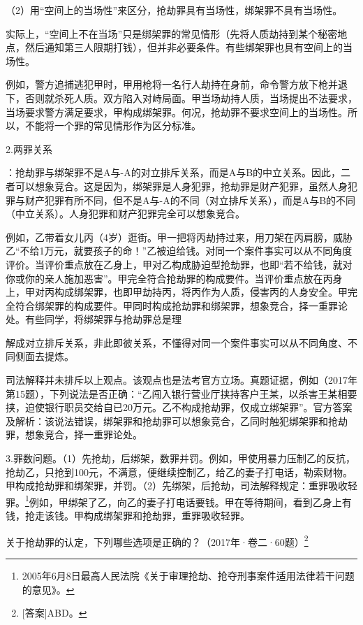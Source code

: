 （2）用“空间上的当场性”来区分，抢劫罪具有当场性，绑架罪不具有当场性。

实际上，“空间上不在当场”只是绑架罪的常见情形（先将人质劫持到某个秘密地点，然后通知第三人限期打钱），但并非必要条件。有些绑架罪也具有空间上的当场性。

例如，警方追捕逃犯甲时，甲用枪将一名行人劫持在身前，命令警方放下枪并退下，否则就杀死人质。双方陷入对峙局面。甲当场劫持人质，当场提出不法要求，当场要求警方满足要求，甲构成绑架罪。何况，抢劫罪不要求空间上的当场性。所以，不能将一个罪的常见情形作为区分标准。

2.两罪关系

：抢劫罪与绑架罪不是A与-A的对立排斥关系，而是A与B的中立关系。因此，二者可以想象竞合。这是因为，绑架罪是人身犯罪，抢劫罪是财产犯罪，虽然人身犯罪与财产犯罪有所不同，但不是A与-A的不同（对立排斥关系），而是A与B的不同（中立关系）。人身犯罪和财产犯罪完全可以想象竞合。

例如，乙带着女儿丙（4岁）逛街。甲一把将丙劫持过来，用刀架在丙肩膀，威胁乙“不给1万元，就要孩子的命！”乙被迫给钱。对同一个案件事实可以从不同角度评价。当评价重点放在乙身上，甲对乙构成胁迫型抢劫罪，也即“若不给钱，就对你或你的亲人施加恶害”。甲完全符合抢劫罪的构成要件。当评价重点放在丙身上，甲对丙构成绑架罪，也即甲劫持丙，将丙作为人质，侵害丙的人身安全。甲完全符合绑架罪的构成要件。甲同时构成抢劫罪和绑架罪，想象竞合，择一重罪论处。有些同学，将绑架罪与抢劫罪总是理

解成对立排斥关系，非此即彼关系，不懂得对同一个案件事实可以从不同角度、不同侧面去提炼。

司法解释并未排斥以上观点。该观点也是法考官方立场。真题证据，例如（2017年第15题），下列说法是否正确：“乙闯入银行营业厅挟持客户王某，以杀害王某相要挟，迫使银行职员交给自已20万元。乙不构成抢劫罪，仅成立绑架罪”。官方答案及解析：该说法错误，绑架罪和抢劫罪可以想象竞合，乙同时触犯绑架罪和抢劫罪，想象竞合，择一重罪论处。

3.罪数问题。（1）先抢劫，后绑架，数罪并罚。例如，甲使用暴力压制乙的反抗，抢劫乙，只抢到100元，不满意，便继续控制乙，给乙的妻子打电话，勒索财物。甲构成抢劫罪和绑架罪，并罚。（2）先绑架，后抢劫，司法解释规定：重罪吸收轻罪。\footnote{2005年6月8日最高人民法院《关于审理抢劫、抢夺刑事案件适用法律若干问题的意见》。}例如，甲绑架了乙，向乙的妻子打电话要钱。甲在等待期间，看到乙身上有钱，抢走该钱。甲构成绑架罪和抢劫罪，重罪吸收轻罪。


关于抢劫罪的认定，下列哪些选项是正确的？（2017年·卷二·60题）\footnote{[答案]ABD。}

